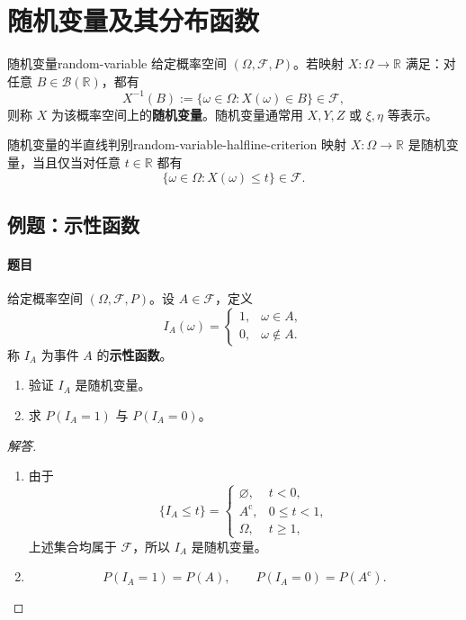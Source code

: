 
\clearpage\section{随机变量及其分布函数}\label{k:cdf}
\label{sec:random-variables-and-distribution-functions}

\begin{mydefinition}{随机变量}{random-variable}
给定概率空间 $(\Omega,\mathscr F,P)$。若映射 $X:\Omega\to\mathbb R$ 满足：对任意 $B\in\mathscr B(\mathbb R)$，都有
\[
X^{-1}(B):=\{\omega\in\Omega:X(\omega)\in B\}\in\mathscr F,
\]
则称 $X$ 为该概率空间上的\textbf{随机变量}。随机变量通常用 $X,Y,Z$ 或 $\xi,\eta$ 等表示。
\end{mydefinition}

\begin{proposition}{随机变量的半直线判别}{random-variable-halfline-criterion}
映射 $X:\Omega\to\mathbb R$ 是随机变量，当且仅当对任意 $t\in\mathbb R$ 都有
\[
\{\omega\in\Omega:X(\omega)\leq t\}\in\mathscr F.
\]
\end{proposition}

\subsection{例题：示性函数}\label{note:c2:e1}
\paragraph{题目}
给定概率空间 $(\Omega,\mathscr F,P)$。设 $A\in\mathscr F$，定义
\[
I_A(\omega)=
\begin{cases}
1,&\omega\in A,\\
0,&\omega\notin A.
\end{cases}
\]
称 $I_A$ 为事件 $A$ 的\textbf{示性函数}。
\begin{enumerate}
\item 验证 $I_A$ 是随机变量。
\item 求 $P(I_A=1)$ 与 $P(I_A=0)$。
\end{enumerate}

\begin{proof}[解答]
\begin{enumerate}
\item 由于
\[
\{I_A\leq t\}=
\begin{cases}
\varnothing,&t<0,\\
A^{\mathrm c},&0\leq t<1,\\
\Omega,&t\geq1,
\end{cases}
\]
上述集合均属于 $\mathscr F$，所以 $I_A$ 是随机变量。
\item \[
P(I_A=1)=P(A),\qquad P(I_A=0)=P(A^{\mathrm c}).
\]
\end{enumerate}
\end{proof}

